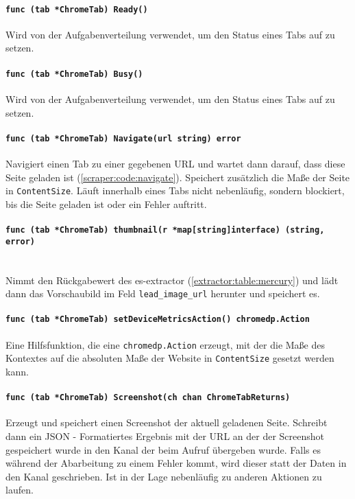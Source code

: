 \paragraph{\texttt{func (tab *ChromeTab) Ready()}} Wird von der Aufgabenverteilung verwendet, um den Status eines Tabs auf  zu setzen.
\paragraph{\texttt{func (tab *ChromeTab) Busy()}} Wird von der Aufgabenverteilung verwendet, um den Status eines Tabs auf  zu setzen.
\paragraph{\texttt{func (tab *ChromeTab) Navigate(url string) error}} Navigiert einen Tab zu einer gegebenen URL und wartet dann darauf, dass diese Seite geladen ist (\autoref{scraper:code:navigate}). Speichert zusätzlich die Maße der Seite in \verb|ContentSize|. Läuft innerhalb eines Tabs nicht nebenläufig, sondern blockiert, bis die Seite geladen ist oder ein Fehler auftritt. 
\paragraph{\texttt{func (tab *ChromeTab) thumbnail(r *map[string]interface{}) (string, error)}} \text{ }\\ Nimmt den Rückgabewert des es-extractor (\autoref{extractor:table:mercury}) und lädt dann das Vorschaubild im Feld \verb|lead_image_url| herunter und speichert es. 
\paragraph{\texttt{func (tab *ChromeTab) setDeviceMetricsAction() chromedp.Action}}
Eine Hilfsfunktion, die eine \verb|chromedp.Action| erzeugt, mit der die Maße des Kontextes auf die absoluten Maße der Website in \verb|ContentSize| gesetzt werden kann.
\paragraph{\texttt{func (tab *ChromeTab) Screenshot(ch chan ChromeTabReturns)}} Erzeugt und speichert einen Screenshot der aktuell geladenen Seite. Schreibt dann ein JSON - Formatiertes Ergebnis mit der URL an der der Screenshot gespeichert wurde in den Kanal der beim Aufruf übergeben wurde. Falls es während der Abarbeitung zu einem Fehler kommt, wird dieser statt der Daten in den Kanal geschrieben. Ist in der Lage nebenläufig zu anderen Aktionen zu laufen.
